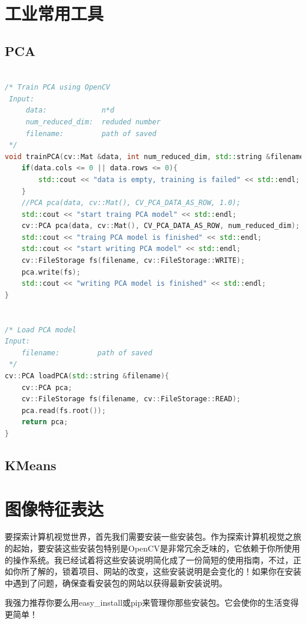 \documentclass[color=cyan,mathpazo,titlestyle=hang]{elegantbook}
\begin{document}
\chapter{工业常用工具}

\section{PCA}

\begin{lstlisting}[language=c++]

/* Train PCA using OpenCV
 Input:
     data:             n*d
     num_reduced_dim:  reduded number
     filename:         path of saved
 */
void trainPCA(cv::Mat &data, int num_reduced_dim, std::string &filename){
    if(data.cols <= 0 || data.rows <= 0){
        std::cout << "data is empty, training is failed" << std::endl;
    }
    //PCA pca(data, cv::Mat(), CV_PCA_DATA_AS_ROW, 1.0);
    std::cout << "start traing PCA model" << std::endl;
    cv::PCA pca(data, cv::Mat(), CV_PCA_DATA_AS_ROW, num_reduced_dim);
    std::cout << "traing PCA model is finished" << std::endl;
    std::cout << "start writing PCA model" << std::endl;
    cv::FileStorage fs(filename, cv::FileStorage::WRITE);
    pca.write(fs);
    std::cout << "writing PCA model is finished" << std::endl;
}


/* Load PCA model
Input:
    filename:         path of saved
 */
cv::PCA loadPCA(std::string &filename){
    cv::PCA pca;
    cv::FileStorage fs(filename, cv::FileStorage::READ);
    pca.read(fs.root());
    return pca;
}
\end{lstlisting}

\section{KMeans}

\chapter{图像特征表达}

要探索计算机视觉世界，首先我们需要安装一些安装包。作为探索计算机视觉之旅的起始，要安装这些安装包特别是OpenCV是非常冗余乏味的，它依赖于你所使用的操作系统。我已经试着将这些安装说明简化成了一份简短的使用指南，不过，正如你所了解的，锁着项目、网站的改变，这些安装说明是会变化的！如果你在安装中遇到了问题，确保查看安装包的网站以获得最新安装说明。

我强力推荐你要么用easy\_install或pip来管理你那些安装包。它会使你的生活变得更简单！
\end{document}
